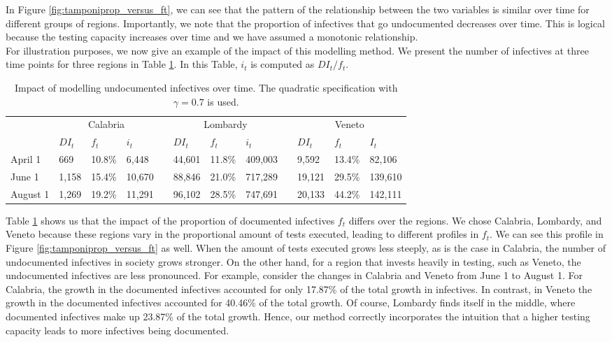 \documentclass[12pt]{article}
\begin{document}
	In Figure \ref{fig:tamponiprop_versus_ft}, we can see that the pattern of the relationship between the two variables is similar over time for different groups of regions. Importantly, we note that the proportion of infectives that go undocumented decreases over time. This is logical because the testing capacity increases over time and we have assumed a monotonic relationship. \\
	
	For illustration purposes, we now give an example of the impact of this modelling method. We present the number of infectives at three time points for three regions in Table \ref{tab:f_t_over_time}. In this Table, $i_t$ is computed as $DI_t / f_t$.
	
	\begin{table}[H]
		\centering
		\caption{Impact of modelling undocumented infectives over time. The quadratic specification with $\gamma = 0.7$ is used.}
		\label{tab:f_t_over_time}
		\begin{tabular}{llllllllllll}
		    \toprule 
                     & \multicolumn{3}{c}{Calabria} && \multicolumn{3}{c}{Lombardy} && \multicolumn{3}{c}{Veneto} \\
                     \cmidrule{2-4}\cmidrule{6-8}\cmidrule{10-12}
                     & $DI_t$  & $f_t$   & $i_t$   && $DI_t$  & $f_t$   & $i_t$    && $DI_t$  & $f_t$  & $I_t$   \\ \midrule
            April 1  & 669     & 10.8\%  & 6,448   && 44,601  & 11.8\%  & 409,003  && 9,592   & 13.4\% & 82,106  \\
            June 1   & 1,158   & 15.4\%  & 10,670  && 88,846  & 21.0\%  & 717,289  && 19,121  & 29.5\% & 139,610 \\
            August 1 & 1,269   & 19.2\%  & 11,291  && 96,102  & 28.5\%  & 747,691  && 20,133  & 44.2\% & 142,111 \\ \bottomrule
        \end{tabular}
	\end{table}
	
	Table \ref{tab:f_t_over_time} shows us that the impact of the proportion of documented infectives $f_t$ differs over the regions. We chose Calabria, Lombardy, and Veneto because these regions vary in the proportional amount of tests executed, leading to different profiles in $f_t$. We can see this profile in Figure \ref{fig:tamponiprop_versus_ft} as well. When the amount of tests executed grows less steeply, as is the case in Calabria, the number of undocumented infectives in society grows stronger. On the other hand, for a region that invests heavily in testing, such as Veneto, the undocumented infectives are less pronounced. For example, consider the changes in Calabria and Veneto from June 1 to August 1. For Calabria, the growth in the documented infectives accounted for only 17.87\% of the total growth in infectives. In contrast, in Veneto the growth in the documented infectives accounted for 40.46\% of the total growth. Of course, Lombardy finds itself in the middle, where documented infectives make up 23.87\% of the total growth. Hence, our method correctly incorporates the intuition that a higher testing capacity leads to more infectives being documented. \\
	
\end{document}
